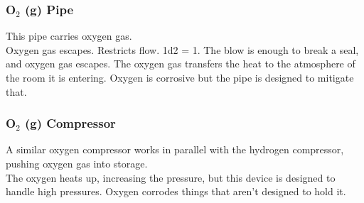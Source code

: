 \documentclass[a4paper]{article}
\begin{document}
\vspace{-0.5cm} \hspace{-18pt} \subsubsection{O$_2$ (g) Pipe} \label{life_o2_pipe} \vspace{-0.2cm}
This pipe carries oxygen gas.
\\ \pbhw
{Oxygen gas escapes.}
{Restricts flow. \newline 1d2 = 1. The blow is enough to break a seal, and oxygen gas escapes.}
{The oxygen gas transfers the heat to the atmosphere of the room it is entering.}
{Oxygen is corrosive but the pipe is designed to mitigate that.}


\vspace{-0.5cm} \hspace{-18pt} \subsubsection{O$_2$ (g) Compressor} \label{life_o2_compressor} \vspace{-0.2cm}
A similar oxygen compressor works in parallel with the hydrogen compressor, pushing oxygen gas into storage.
\\ \pbhw
{}
{}
{The oxygen heats up, increasing the pressure, but this device is designed to handle high pressures.}
{Oxygen corrodes things that aren't designed to hold it.}
\end{document}
